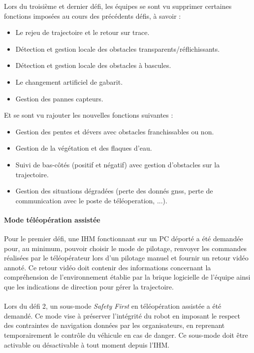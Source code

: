 Lors du troisième et dernier défi, les équipes se sont vu supprimer certaines fonctions imposées au cours des précédents défis, à savoir :\\
\begin{itemize}
\renewcommand{\labelitemi}{$\bullet$}
    \item Le rejeu de trajectoire et le retour sur trace.
    \item Détection et gestion locale des obstacles transparents/réflichissants.
    \item Détection et gestion locale des obstacles à bascules.
    \item Le changement artificiel de gabarit.
    \item Gestion des pannes capteurs. \\
\end{itemize}

Et se sont vu rajouter les nouvelles fonctions suivantes :\\
\begin{itemize}
\renewcommand{\labelitemi}{$\bullet$}
    \item Gestion des pentes et dévers avec obstacles franchissables ou non.
    \item Gestion de la végétation et des flaques d'eau.
    \item Suivi de bas-côtés (positif et négatif) avec gestion d'obstacles sur la trajectoire.
    \item Gestion des situations dégradées (perte des donnés gnss, perte de communication avec le poste de téléoperation, ...).
\end{itemize}


\paragraph{Mode téléopération assistée}
Pour le premier défi, une IHM fonctionnant sur un PC déporté a été demandée pour, au minimum, pouvoir choisir le mode de pilotage, renvoyer les commandes réalisées par le téléopérateur lors d'un pilotage manuel et fournir un retour vidéo annoté. Ce retour vidéo doit contenir des informations concernant la compréhension de l'environnement établie par la brique logicielle de l'équipe ainsi que les indications de direction pour gérer la trajectoire.\\\\
\indent Lors du défi 2, un sous-mode \textit{Safety First} en téléopération assistée a été demandé. Ce mode vise à préserver l'intégrité du robot en imposant le respect des contraintes de navigation données par les organisateurs, en reprenant temporairement le contrôle du véhicule en cas de danger. Ce sous-mode doit être activable ou désactivable à tout moment depuis l'IHM.

